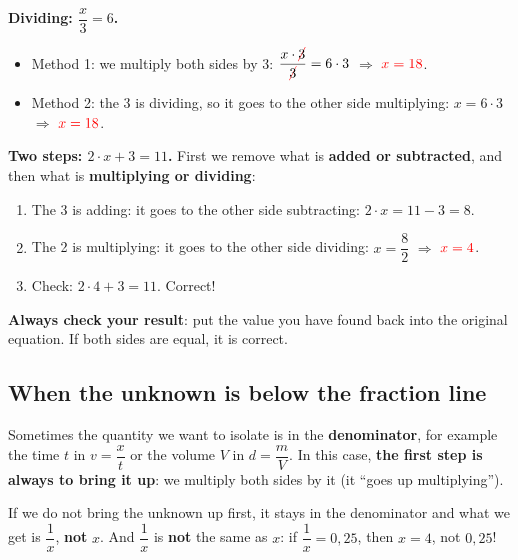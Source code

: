 \begin{example}
    \textbf{Dividing: \(\dfrac{x}{3} = 6\).}
    \begin{itemize}
        \item Method 1: we multiply both sides by 3: \(\dfrac{x \cdot \cancelred{3}}{\cancelred{3}} = 6 \cdot 3\) \(\Rightarrow\) \(\textcolor{red}{x = 18}\).
        \item Method 2: the 3 is dividing, so it goes to the other side multiplying: \(x = 6 \cdot 3\) \(\Rightarrow\) \(\textcolor{red}{x = 18}\).
    \end{itemize}
\end{example}

\begin{example}
    \textbf{Two steps: \(2 \cdot x + 3 = 11\).} First we remove what is \textbf{added or subtracted}, and then what is \textbf{multiplying or dividing}:
    \begin{enumerate}[label=\numberballmDarkTeal]
        \item The 3 is adding: it goes to the other side subtracting: \(2 \cdot x = 11 - 3 = 8\).
        \item The 2 is multiplying: it goes to the other side dividing: \(x = \dfrac{8}{2}\) \(\Rightarrow\) \(\textcolor{red}{x = 4}\).
        \item Check: \(2 \cdot 4 + 3 = 11\). \textcolor{green!50!black}{Correct!}
    \end{enumerate}
\end{example}

\begin{marker}
    \textbf{Always check your result}: put the value you have found back into the original equation. If both sides are equal, it is correct.
\end{marker}

\subsection{When the unknown is below the fraction line}

Sometimes the quantity we want to isolate is in the \textbf{denominator}, for example the time \(t\) in \(v = \dfrac{x}{t}\) or the volume \(V\) in \(d = \dfrac{m}{V}\). In this case, \textbf{the first step is always to bring it up}: we multiply both sides by it (it ``goes up multiplying'').

\begin{impt}
    If we do not bring the unknown up first, it stays in the denominator and what we get is \(\dfrac{1}{x}\), \textbf{not} \(x\). And \(\dfrac{1}{x}\) is \textbf{not} the same as \(x\): if \(\dfrac{1}{x} = 0{,}25\), then \(x = 4\), not \(0{,}25\)!
\end{impt}

